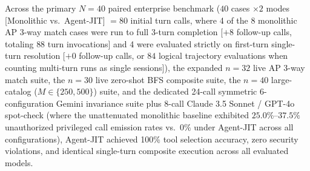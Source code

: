\documentclass[conference,10pt]{IEEEtran}
\begin{document}
Across the primary $N = 40$ paired enterprise benchmark ($40$ cases $\times 2$ modes [Monolithic vs.\ Agent-JIT] $= 80$ initial turn calls, where 4 of the 8 monolithic AP 3-way match cases were run to full 3-turn completion [$+8$ follow-up calls, totaling $88$ turn invocations] and 4 were evaluated strictly on first-turn single-turn resolution [$+0$ follow-up calls, or $84$ logical trajectory evaluations when counting multi-turn runs as single sessions]), the expanded $n = 32$ live AP 3-way match suite, the $n = 30$ live zero-shot BFS composite suite, the $n = 40$ large-catalog ($M \in \{250, 500\}$) suite, and the dedicated 24-call symmetric 6-configuration Gemini invariance suite plus 8-call Claude 3.5 Sonnet / GPT-4o spot-check (where the unattenuated monolithic baseline exhibited $25.0\%$--$37.5\%$ unauthorized privileged call emission rates vs.\ $0\%$ under Agent-JIT across all configurations), Agent-JIT achieved 100\% tool selection accuracy, zero security violations, and identical single-turn composite execution across all evaluated models.
\end{document}
